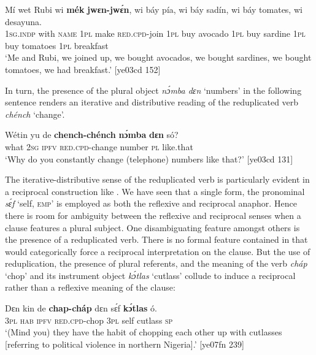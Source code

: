 \ea%
    \label{ex:key:140}
    \gll Mí    wet    Rubi    wi  \textbf{mék}    \textbf{jwɛn-jwɛ́n},  wi  báy  pía,
wi  báy  sadín,  wi  báy  tomates,    wi  desayuna.\\
\textsc{1sg.indp}  with    \textsc{name}  \textsc{1pl}  make  \textsc{red}.\textsc{cpd}{}-join  \textsc{1pl}  buy  avocado
\textsc{1pl}  buy  sardine  \textsc{1pl}  buy  tomatoes  \textsc{1pl}  breakfast\\
\glt ‘Me and Rubi, we joined up, we bought avocados, we bought sardines, we 
bought tomatoes, we had breakfast.’ [ye03cd 152]
\z

In turn, the presence of the plural object \textit{nɔ́mba dɛn} ‘numbers’ in the following sentence renders an iterative and distributive reading of the reduplicated verb \textit{chénch} ‘change’. 


\ea%
    \label{ex:key:141}
    \gll Wétin  yu  de \textbf{  chench-chénch}  \textbf{nɔ́mba}  \textbf{dɛn}  só?\\
what  \textsc{2sg}  \textsc{ipfv}  {\textsc{red.cpd-}change}  number  \textsc{pl}  like.that\\

\glt ‘Why do you constantly change (telephone) numbers like that?’ [ye03cd 131]
\z

The iterative-distributive sense of the reduplicated verb is particularly evident in a reciprocal{\fff} construction like . We have seen that a single form, the pronominal \textit{sɛ́f} ‘self, \textsc{emp}’ is employed as both the reflexive{\fff} and reciprocal anaphor. Hence there is room for ambiguity between the reflexive and reciprocal senses when a clause features a plural subject. One disambiguating feature amongst others is the presence of a reduplicated verb. There is no formal feature contained in  that would categorically force a reciprocal interpretation on the clause. But the use of reduplication, the presence of plural referents, and the meaning of the verb \textit{cháp} ‘chop’ and its instrument{\fff} object \textit{kɔ́tlas} ‘cutlass’ collude to induce a reciprocal rather than a reflexive meaning of the clause: 


\ea%
    \label{ex:key:142}
    \gll Dɛn  kin  de  \textbf{chap-cháp}  dɛn  sɛ́f  \textbf{kɔ́tlas}  ó.\\
\textsc{3pl}  \textsc{hab}  \textsc{ipfv}  \textsc{red.cpd-}chop  \textsc{3pl}  self  cutlass  \textsc{sp}\\

\glt ‘(Mind you) they have the habit of chopping each other up with cutlasses
[referring to political violence in northern Nigeria].’ [ye07fn 239]
\z

